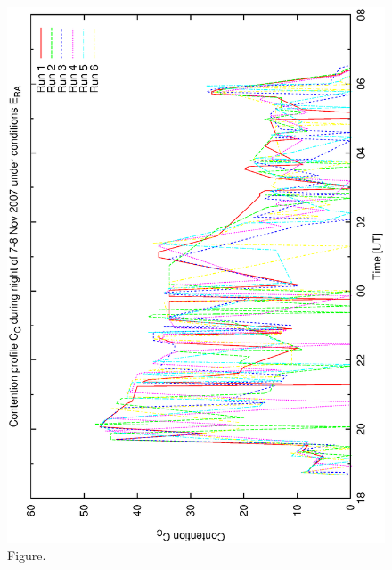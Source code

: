 \documentclass[12pt,a4paper]{article}
\begin{document}
\begin{figure}[htbp]
 \begin{center}
  \includegraphics[scale=1.0, angle=0]{figures/bsb_rnd_cont.eps}
 \end{center}
  \caption[Figure.]
{Figure.}
\end{figure}
\clearpage
\end{document}
